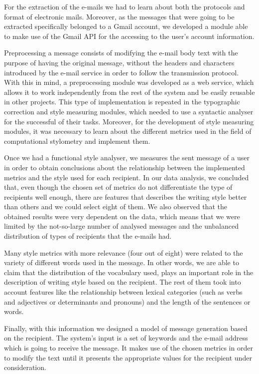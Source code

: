 For the extraction of the e-mails we had to learn about both the protocols and format of electronic mails. Moreover, as the messages that were going to be extracted specifically belonged to a Gmail account, we developed a module able to make use of the Gmail API for the accessing to the user's account information.

Preprocessing a message consists of modifying the e-mail body text with the purpose of having the original message, without the headers and characters introduced by the e-mail service in order to follow the transmission protocol. With this in mind, a preprocessing module was developed as a web service, which allows it to work independently from the rest of the system and be easily reusable in other projects. This type of implementation is repeated in the typographic correction and style measuring modules, which needed to use a syntactic analyser for the successful of their tasks. Moreover, for the development of style measuring modules, it was necessary to learn about the different metrics used in the field of computational stylometry and implement them.

Once we had a functional style analyser, we measures the sent message of a user in order to obtain conclusions about the relationship between the implemented metrics and the style used for each recipient. In our data analysis, we concluded that, even though the chosen set of metrics do not differentiate the type of recipients well enough, there are features that describes the writing style better than others and we could select eight of them. We also observed that the obtained results were very dependent on the data, which means that we were limited by the not-so-large number of analysed messages and the unbalanced distribution of types of recipients that the e-mails had.

Many style metrics with more relevance (four out of eight) were related to the variety of different words used in the message. In other words, we are able to claim that the distribution of the vocabulary used, plays an important role in the description of writing style based on the recipient. The rest of them took into account features like the relationship between lexical categories (such as verbs and adjectives or determinants and pronouns) and the length of the sentences or words.

Finally, with this information we designed a model of message generation based on the recipient. The system's input is a set of keywords and the e-mail address which is going to receive the message. It makes use of the chosen metrics in order to modify the text until it presents the appropriate values for the recipient under consideration.

